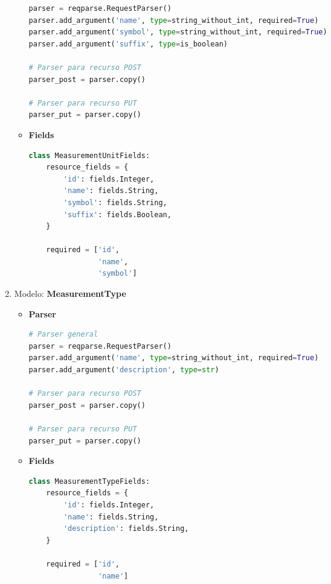 \begin{enumerate}
\begin{itemize}
\begin{lstlisting}[language=Python]
parser = reqparse.RequestParser()
parser.add_argument('name', type=string_without_int, required=True)
parser.add_argument('symbol', type=string_without_int, required=True)
parser.add_argument('suffix', type=is_boolean)

# Parser para recurso POST
parser_post = parser.copy()

# Parser para recurso PUT
parser_put = parser.copy()
\end{lstlisting}

	\item \textbf{Fields}
	
\begin{lstlisting}[language=Python]
class MeasurementUnitFields:
    resource_fields = {
        'id': fields.Integer,
        'name': fields.String,
        'symbol': fields.String,
        'suffix': fields.Boolean,
    }

    required = ['id',
                'name',
                'symbol']
\end{lstlisting}

\end{itemize}

\item Modelo: \textbf{MeasurementType}

\begin{itemize}
	\item \textbf{Parser}
	
\begin{lstlisting}[language=Python]
# Parser general
parser = reqparse.RequestParser()
parser.add_argument('name', type=string_without_int, required=True)
parser.add_argument('description', type=str)

# Parser para recurso POST
parser_post = parser.copy()

# Parser para recurso PUT
parser_put = parser.copy()
\end{lstlisting}

	\item \textbf{Fields}
	
\begin{lstlisting}[language=Python]
class MeasurementTypeFields:
    resource_fields = {
        'id': fields.Integer,
        'name': fields.String,
        'description': fields.String,
    }

    required = ['id',
                'name']
\end{lstlisting}

\end{itemize}


\end{enumerate}
